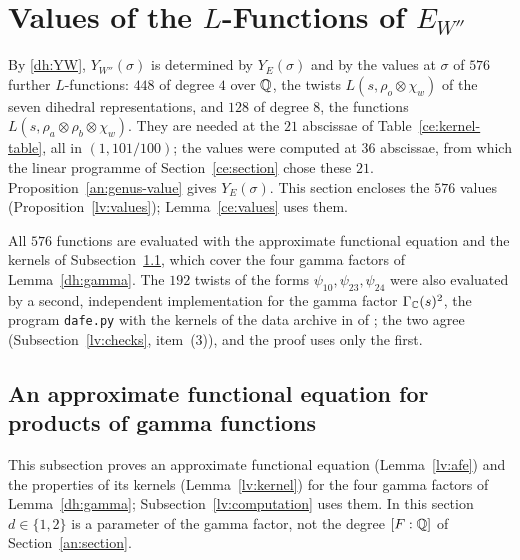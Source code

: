\section{\texorpdfstring{Values of the $L$-Functions of $E_{W''}$}{Values of the L-Functions of E\_W''}}
\label{lv:section}

By \eqref{dh:YW}, $Y_{W''}(\sigma)$ is determined by $Y_E(\sigma)$ and by the
values at $\sigma$ of $576$ further $L$-functions: $448$ of degree $4$ over
$\mathbb Q$, the twists $L(s,\rho_o\otimes\chi_w)$ of the seven dihedral
representations, and $128$ of degree $8$, the functions
$L(s,\rho_a\otimes\rho_b\otimes\chi_w)$. They are needed at the $21$
abscissae of Table~\ref{ce:kernel-table}, all in $(1,101/100)$; the values
were computed at $36$ abscissae, from which the linear programme of
Section~\ref{ce:section} chose these $21$. Proposition~\ref{an:genus-value}
gives $Y_E(\sigma)$. This section encloses the $576$ values
(Proposition~\ref{lv:values}); Lemma~\ref{ce:values} uses them.

All $576$ functions are evaluated with the approximate functional
equation and the kernels of Subsection~\ref{lv:afe-general}, which cover
the four gamma factors of Lemma~\ref{dh:gamma}. The $192$ twists of the
forms $\psi_{10},\psi_{23},\psi_{24}$ were also evaluated by a second,
independent implementation for the gamma factor $\Gamma_\mathbb C(s)^2$, the
program \texttt{dafe.py} with the kernels of the data archive in
 of \cite{NaslundCode4317};
the two agree (Subsection~\ref{lv:checks}, item~(3)), and the proof uses
only the first.

\subsection{An approximate functional equation for products of gamma
functions}\label{lv:afe-general}
This subsection proves an approximate functional equation
(Lemma~\ref{lv:afe}) and the properties of its kernels
(Lemma~\ref{lv:kernel}) for the four gamma factors of Lemma~\ref{dh:gamma};
Subsection~\ref{lv:computation} uses them. In this section $d\in\{1,2\}$ is
a parameter of the gamma factor, not the degree $[F:\mathbb Q]$ of
Section~\ref{an:section}.

